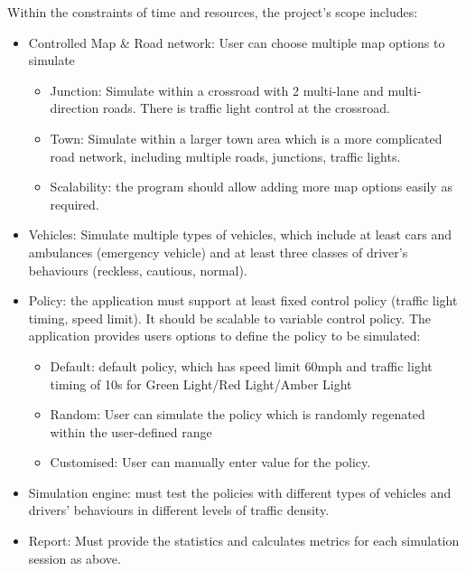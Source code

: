 \documentclass[11pt]{article}
\begin{document}
Within the constraints of time and resources, the project's scope includes:
\begin{itemize}[noitemsep]
	\item Controlled Map & Road network: User can choose multiple map options to simulate
    \begin{itemize}[noitemsep]
	\item Junction: Simulate within a crossroad with 2 multi-lane and multi-direction roads. There is traffic light control at the crossroad.
	\item Town: Simulate within a larger town area which is a more complicated road network, including multiple roads, junctions, traffic lights. 
	\item Scalability: the program should allow adding more map options easily as required. 
	
	\end{itemize}

\item Vehicles: Simulate multiple types of vehicles, which include at least cars and ambulances (emergency vehicle) and at least three classes of driver’s behaviours (reckless, cautious, normal).

\item Policy: the application must support at least fixed control policy (traffic light timing, speed limit). It should be scalable to variable control policy. The application provides users options to define the policy to be simulated:
    \begin{itemize}
    \item Default: default policy, which has speed limit 60mph and traffic light timing of 10s for Green Light/Red Light/Amber Light
    \item Random: User can simulate the policy which is randomly regenated within the user-defined range
    \item Customised: User can manually enter value for the policy.
    \end{itemize}

\item Simulation engine: must test the policies with different types of vehicles and drivers' behaviours in different levels of traffic density.
\item Report: Must provide the statistics and calculates metrics  for each simulation session as above.
\end{itemize}

	
\end{document}
